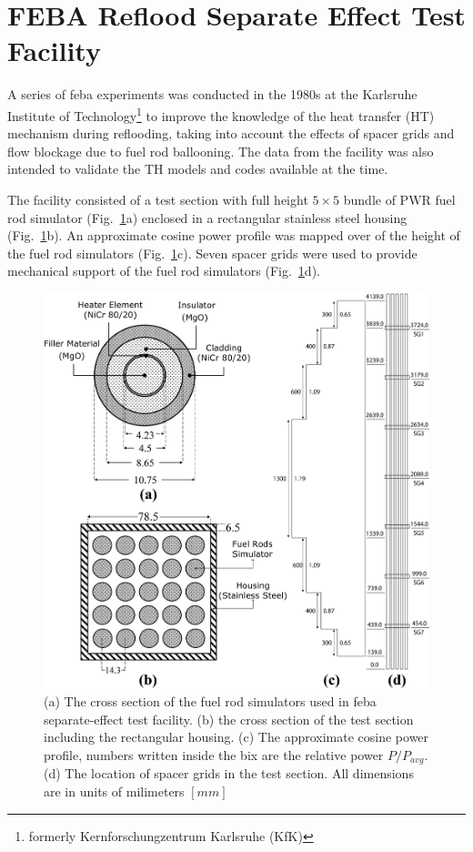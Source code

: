 \section{FEBA Reflood Separate Effect Test Facility}\label{sec:reflood_feba_setf}

A series of \gls{feba} experiments was conducted in the 1980s at the Karlsruhe Institute of Technology\footnote{formerly Kernforschungzentrum Karlsruhe (KfK)}
to improve the knowledge of the heat transfer (\textsc{HT}) mechanism during reflooding,
taking into account the effects of spacer grids and flow blockage due to fuel rod ballooning.
The data from the facility was also intended to validate the TH models and codes available at the time.

The facility consisted of a test section with full height $5 \times 5$ bundle of \textsc{PWR} fuel rod simulator (Fig.~\ref{fig:feba_setf}a) enclosed in a rectangular stainless steel housing (Fig.~\ref{fig:feba_setf}b).
An approximate cosine power profile was mapped over of the height of the fuel rod simulators (Fig.~\ref{fig:feba_setf}c).
Seven spacer grids were used to provide mechanical support of the fuel rod simulators (Fig.~\ref{fig:feba_setf}d).

\begin{figure}[bth]
	\includegraphics[width=1.0\textwidth]{../figures/febaTestSection/febaTestSection.png}
	\caption[FEBA experimental facility]{(a) The cross section of the fuel rod simulators used in \gls{feba} separate-effect test facility. (b) the cross section of the test section including the rectangular housing. (c)  The approximate cosine power profile, numbers written inside the bix are the relative power $P/P_{avg}$. (d) The location of spacer grids in the test section. All dimensions are in units of milimeters $[mm]$}\label{fig:feba_setf}
\end{figure}

